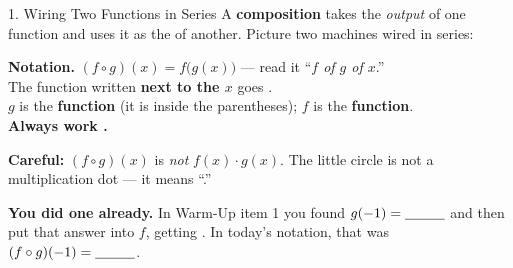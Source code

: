 \documentclass[10pt]{article}
\begin{document}
\begin{notesbox}{1. Wiring Two Functions in Series}
A \textbf{composition} takes the \emph{output} of one function and uses it as the
\blank{2.0cm} of another. Picture two machines wired in series:
\begin{center}
\end{center}
\vspace{-2pt}
\begin{center}
\begin{tcolorbox}[colback=goldbg, colframe=goldacc, boxrule=0.8pt, arc=1.5mm, width=0.94\linewidth,
    left=3mm, right=3mm, top=2mm, bottom=2mm]
\centering\small
\textbf{Notation.} \quad $(f\circ g)(x)=f\big(g(x)\big)$ \quad --- read it ``\emph{$f$ of $g$ of
$x$}.'' \\[4pt]
The function written \textbf{next to the $x$} goes \blank{1.6cm}. \\[3pt]
$g$ is the \textbf{\blank{1.8cm} function} (it is inside the parentheses); \;
$f$ is the \textbf{\blank{1.8cm} function}. \\[3pt]
\textbf{Always work \blank{2.6cm}.}
\end{tcolorbox}
\end{center}
\vspace{2pt}
\textbf{Careful:} $(f\circ g)(x)$ is \emph{not} $f(x)\cdot g(x)$. The little circle is not a
multiplication dot --- it means ``\blank{3.0cm}.''

\vspace{4pt}
\textbf{You did one already.} In Warm-Up item 1 you found $g(-1)=\blank{1.0cm}$ and then put that
answer into $f$, getting \blank{1.0cm}. In today's notation, that was
$(f\circ g)(-1)=\blank{1.0cm}$.
\end{notesbox}
\end{document}
